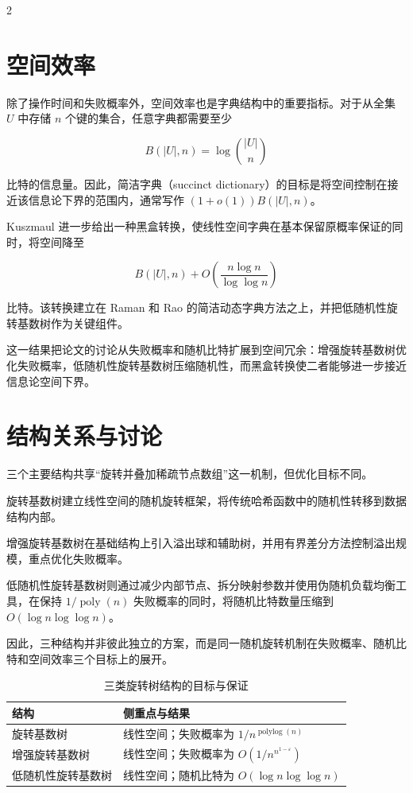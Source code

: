 \documentclass[10.5pt,compsoc,UTF8]{CjC}
\theoremstyle{mystyle}
\begin{document}
\begin{multicols}{2}
\section{\heiti 空间效率}

除了操作时间和失败概率外，空间效率也是字典结构中的重要指标。对于从全集 $U$ 中存储 $n$ 个键的集合，任意字典都需要至少

\begin{equation}
B(|U|,n)=\log \binom{|U|}{n}
\end{equation}

比特的信息量。因此，简洁字典（succinct dictionary）的目标是将空间控制在接近该信息论下界的范围内，通常写作 $(1+o(1))B(|U|,n)$。

Kuszmaul 进一步给出一种黑盒转换，使线性空间字典在基本保留原概率保证的同时，将空间降至

\begin{equation}
B(|U|,n)+O\left(\frac{n\log n}{\log\log n}\right)
\end{equation}

比特\cite{kuszmaul2022hash}。该转换建立在 Raman 和 Rao 的简洁动态字典方法之上\cite{raman2003succinct}，并把低随机性旋转基数树作为关键组件。

这一结果把论文的讨论从失败概率和随机比特扩展到空间冗余：增强旋转基数树优化失败概率，低随机性旋转基数树压缩随机性，而黑盒转换使二者能够进一步接近信息论空间下界。

\section{\heiti 结构关系与讨论}

三个主要结构共享“旋转并叠加稀疏节点数组”这一机制，但优化目标不同。

旋转基数树建立线性空间的随机旋转框架，将传统哈希函数中的随机性转移到数据结构内部。

增强旋转基数树在基础结构上引入溢出球和辅助树，并用有界差分方法控制溢出规模，重点优化失败概率。

低随机性旋转基数树则通过减少内部节点、拆分映射参数并使用伪随机负载均衡工具，在保持 $1/\operatorname{poly}(n)$ 失败概率的同时，将随机比特数量压缩到 $O(\log n\log\log n)$。

因此，三种结构并非彼此独立的方案，而是同一随机旋转机制在失败概率、随机比特和空间效率三个目标上的展开。

\begin{table}[H]
\centering
\caption{三类旋转树结构的目标与保证}
\begin{tabular}{@{}>{\raggedright\arraybackslash}p{22mm}>{\raggedright\arraybackslash}p{46mm}@{}}
\toprule
结构 & 侧重点与结果 \\
\midrule
旋转基数树 & 线性空间；失败概率为 $1/n^{\operatorname{polylog}(n)}$ \\
增强旋转基数树 & 线性空间；失败概率为 $O(1/n^{n^{1-\varepsilon}})$ \\
低随机性旋转基数树 & 线性空间；随机比特为 $O(\log n\log\log n)$ \\
\bottomrule
\end{tabular}
\end{table}


\end{multicols}
\end{document}
